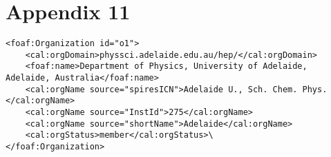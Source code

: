 \section*{Appendix 11}
\label{sec:app11}

\begin{lstlisting}
<foaf:Organization id="o1">
    <cal:orgDomain>physsci.adelaide.edu.au/hep/</cal:orgDomain>
    <foaf:name>Department of Physics, University of Adelaide, Adelaide, Australia</foaf:name>
    <cal:orgName source="spiresICN">Adelaide U., Sch. Chem. Phys.</cal:orgName>
    <cal:orgName source="InstId">275</cal:orgName>
    <cal:orgName source="shortName">Adelaide</cal:orgName>
    <cal:orgStatus>member</cal:orgStatus>\
</foaf:Organization>

\end{lstlisting}